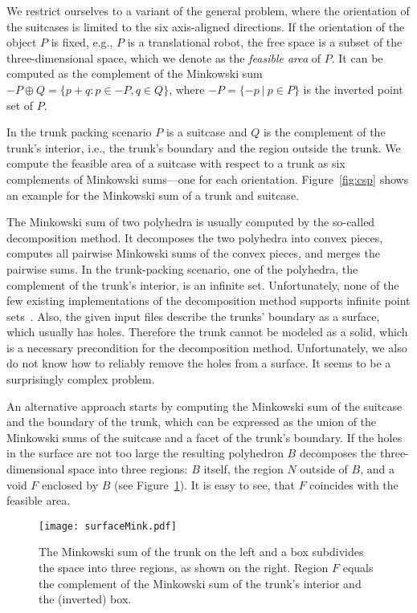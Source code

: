 \documentclass{article}
\begin{document}
We restrict ourselves to a variant of the general problem, where the
orientation of the suitcases is limited to the six axis-aligned
directions. If the orientation of the object $P$ is fixed, e.g., $P$ is
a translational robot, the free space is a subset of the
three-dimensional space, which we denote as the \emph{feasible area}
of $P$. It can be computed as the complement of the Minkowski sum
$-P\oplus Q =\{p+q:p\in -P, q \in Q \}$, where $-P=\{-p\ |\ p\in P\}$ is
the inverted point set of $P$. 

In the trunk packing scenario $P$ is a suitcase and $Q$ is the
complement of the trunk's interior, i.e., the trunk's boundary and the
region outside the trunk. We compute the feasible area of a suitcase
with respect to a trunk as six complements of Minkowski sums---one for
each orientation. Figure~\ref{fig:csp} shows an example for the
Minkowski sum of a trunk and suitcase.

The Minkowski sum of two polyhedra is usually computed by the
so-called decomposition method. It decomposes the two polyhedra into
convex pieces, computes all pairwise Minkowski sums of the convex
pieces, and merges the pairwise sums. In the trunk-packing scenario,
one of the polyhedra, the complement of the trunk's interior, is an
infinite set. Unfortunately, none of the few existing implementations
of the decomposition method supports infinite point
sets~\cite{h-emspe-07,vm-amsap-04}. Also, the given input files
describe the trunks' boundary as a surface, which usually has
holes. Therefore the trunk cannot be modeled as a solid, which is a
necessary precondition for the decomposition method. Unfortunately, we
also do not know how to reliably remove the holes from a surface. It
seems to be a surprisingly complex problem.

An alternative approach starts by computing the Minkowski sum of the
suitcase and the boundary of the trunk, which can be expressed as the
union of the Minkowski sums of the suitcase and a facet of the trunk's
boundary. If the holes in the surface are not too large the resulting
polyhedron $B$ decomposes the three-dimensional space into three
regions: $B$ itself, the region $N$ outside of $B$, and a void $F$
enclosed by $B$ (see Figure~\ref{fig:surfaceMink}). It is easy to see,
that $F$ coincides with the feasible area.

\begin{figure}[t]
\center
\texttt{[image: surfaceMink.pdf]}
\caption{\label{fig:surfaceMink} The Minkowski sum of the trunk on the
left and a box subdivides the space into three regions, as shown on
the right. Region $F$ equals the complement of the Minkowski sum of
the trunk's interior and the (inverted) box.}
\end{figure}
\end{document}
